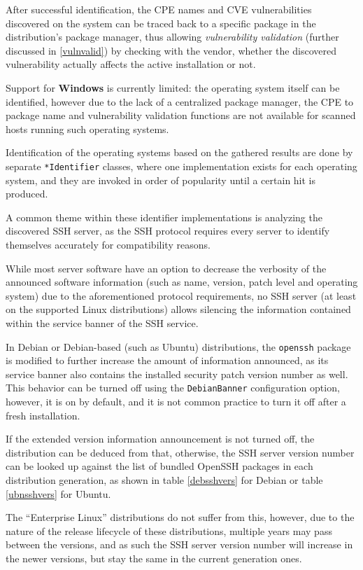 \documentclass[a4paper,12pt]{article}
\begin{document}
	After successful identification, the CPE names and CVE vulnerabilities discovered on the system can be traced back to a specific package in the distribution's package manager, thus allowing \textit{vulnerability validation} (further discussed in \ref{vulnvalid}) by checking with the vendor, whether the discovered vulnerability actually affects the active installation or not.
	
	Support for \textbf{Windows} is currently limited: the operating system itself can be identified, however due to the lack of a centralized package manager, the CPE to package name and vulnerability validation functions are not available for scanned hosts running such operating systems.
	
	Identification of the operating systems based on the gathered results are done by separate \texttt{*Identifier} classes, where one implementation exists for each operating system, and they are invoked in order of popularity until a certain hit is produced.
	
	A common theme within these identifier implementations is analyzing the discovered SSH server, as the SSH protocol requires every server to identify themselves accurately for compatibility reasons.
	
	While most server software have an option to decrease the verbosity of the announced software information (such as name, version, patch level and operating system) due to the aforementioned protocol requirements, no SSH server (at least on the supported Linux distributions) allows silencing the information contained within the service banner of the SSH service.
	
	In Debian or Debian-based (such as Ubuntu) distributions, the \texttt{openssh} package is modified to further increase the amount of information announced, as its service banner also contains the installed security patch version number as well. This behavior can be turned off using the \texttt{DebianBanner} configuration option, however, it is on by default, and it is not common practice to turn it off after a fresh installation.
	
	If the extended version information announcement is not turned off, the distribution can be deduced from that, otherwise, the SSH server version number can be looked up against the list of bundled OpenSSH packages in each distribution generation, as shown in table \ref{debsshvers} for Debian or table \ref{ubnsshvers} for Ubuntu.
	
	The ``Enterprise Linux'' distributions do not suffer from this, however, due to the nature of the release lifecycle of these distributions, multiple years may pass between the versions, and as such the SSH server version number will increase in the newer versions, but stay the same in the current generation ones.
	
\end{document}
